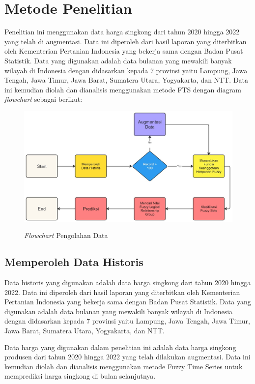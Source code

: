 \documentclass[conference]{IEEEtran}
\begin{document}
\section{Metode Penelitian}

Penelitian ini menggunakan data harga singkong dari tahun 2020 hingga 2022 yang telah di augmentasi. Data ini diperoleh dari hasil laporan yang diterbitkan oleh Kementerian Pertanian Indonesia yang bekerja sama dengan Badan Pusat Statistik. Data yang digunakan adalah data bulanan yang mewakili banyak wilayah di Indonesia dengan didasarkan kepada 7 provinsi yaitu Lampung, Jawa Tengah, Jawa Timur, Jawa Barat, Sumatera Utara, Yogyakarta, dan NTT. Data ini kemudian diolah dan dianalisis menggunakan metode FTS dengan diagram \textit{flowchart} sebagai berikut:

\begin{figure}[htbp]
    \centering
    {\includegraphics[width=\columnwidth]{images/Flowchart FTS.jpg}} 
    \caption{\textit{Flowchart} Pengolahan Data}
\end{figure}


\subsection{Memperoleh Data Historis}
Data historis yang digunakan adalah data harga singkong dari tahun 2020 hingga 2022. Data ini diperoleh dari hasil laporan yang diterbitkan oleh Kementerian Pertanian Indonesia yang bekerja sama dengan Badan Pusat Statistik. Data yang digunakan adalah data bulanan yang mewakili banyak wilayah di Indonesia dengan didasarkan kepada 7 provinsi yaitu Lampung, Jawa Tengah, Jawa Timur, Jawa Barat, Sumatera Utara, Yogyakarta, dan NTT.

Data harga yang digunakan dalam penelitian ini adalah data harga singkong produsen dari tahun 2020 hingga 2022 yang telah dilakukan augmentasi. Data ini kemudian diolah dan dianalisis menggunakan metode Fuzzy Time Series untuk memprediksi harga singkong di bulan selanjutnya.
\end{document}

